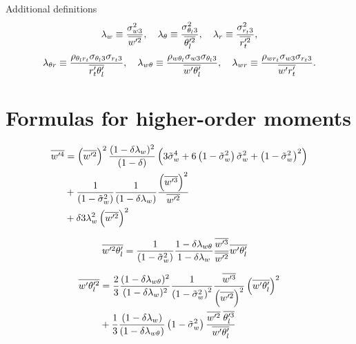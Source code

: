 \documentclass[10pt]{beamer}
\numberwithin{equation}{section}
\begin{document}
    \begin{frame}{Additional definitions}
        \begin{align}
            \label{eq:lambda}
            \lambda_w \equiv \frac{\sigma_{w 3}^2}{\overline{w'^2}}, \quad
            \lambda_\theta \equiv \frac{\sigma_{\theta_l 3}^2}{\overline{\theta_l'^2}}, \quad
            \lambda_r \equiv \frac{\sigma_{r_t 3}^2}{\overline{r_t'^2}},
        \end{align}
        \begin{align}
            \label{eq:lambda_two}
            \lambda_{\theta r} \equiv
            \frac{\rho_{\theta_l r_t} \sigma_{\theta_l 3} \sigma_{r_t 3}}{\overline{r_t' \theta_l'}}, \quad
            \lambda_{w \theta} \equiv
            \frac{\rho_{w \theta_l} \sigma_{w 3} \sigma_{\theta_l 3}}{\overline{w' \theta_l'}}, \quad
            \lambda_{w r} \equiv
            \frac{\rho_{w r_t} \sigma_{w 3} \sigma_{r_t 3}}{\overline{w' r_t'}}.
        \end{align}
    \end{frame}


    \section{Formulas for higher-order moments}\label{sec:formulas-for-higher-order-moments}

    \begin{frame}
        \begin{align}
            \label{eq:wp4}
            \overline{w'^4}
            &= \left(\overline{w'^2}\right)^2
            \frac{(1-\delta \lambda_w)^2}{(1-\delta)}
            \left(3 {\tilde{\sigma}_w}^4 + 6 \left( 1 - \tilde{\sigma}_w^2 \right) {\tilde{\sigma}_w}^2 + \left( 1 - \tilde{\sigma}_w^2 \right)^2\right) \nonumber\\
            &+ \frac{1}{\left( 1 - \tilde{\sigma}_w^2 \right)} \frac{1}{(1-\delta \lambda_w)}
            \frac{\left(\overline{w'^3}\right)^2}{\overline{w'^2}} \nonumber\\
            &+ \delta 3 \lambda_w^2 \left(\overline{w'^2}\right)^2
        \end{align}
    \end{frame}

    \begin{frame}
        \begin{align}
            \label{eq:wp2thlp_solved}
            \overline{w'^2 \theta_l'}
            &= \frac{1}{\left( 1 - \tilde{\sigma}_w^2 \right)} \frac{1 - \delta \lambda_{w\theta}}{1-\delta \lambda_w} \frac{\overline{w'^3}}{\overline{w'^2}} \overline{w' \theta_l'}
        \end{align}
    \end{frame}

    \begin{frame}
        \begin{align}
            \label{eq:wpthlp2_solved}
            \overline{w' \theta_l'^2}
            &= \frac{2}{3} \frac{(1-\delta \lambda_{w \theta})^2}{(1-\delta \lambda_w)^2} \frac{1}{\left( 1 - \tilde{\sigma}_w^2 \right)^2} \frac{\overline{w'^3}}{\left(\overline{w'^2} \right)^2} \left(\overline{w' \theta_l'} \right)^2 \nonumber\\
            &+ \frac{1}{3} \frac{(1-\delta \lambda_w)}{(1-\delta \lambda_{w \theta})} \left( 1 - \tilde{\sigma}_w^2 \right) \frac{\overline{w'^2} \; \overline{\theta_l'^3}}{\overline{w' \theta_l'}}
        \end{align}
    \end{frame}
\end{document}
